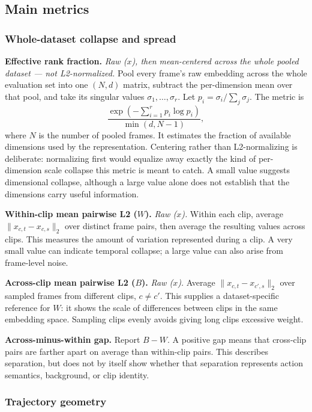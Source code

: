 \subsection{Main metrics}

\subsubsection{Whole-dataset collapse and spread}

\noindent\textbf{Effective rank fraction.} \emph{Raw ($x$), then mean-centered across the
whole pooled dataset --- not L2-normalized.} Pool every frame's raw embedding across the
whole evaluation set into one $(N,d)$ matrix, subtract the per-dimension mean over that
pool, and take its singular values $\sigma_1,\ldots,\sigma_r$. Let
$p_i=\sigma_i/\sum_j\sigma_j$. The metric is
\[
    \frac{\exp\!\left(-\sum_{i=1}^{r}p_i\log p_i\right)}
         {\min(d,N-1)},
\]
where $N$ is the number of pooled frames. It estimates the fraction of available
dimensions used by the representation. Centering rather than L2-normalizing is
deliberate: normalizing first would equalize away exactly the kind of per-dimension
scale collapse this metric is meant to catch. A small value suggests dimensional
collapse, although a large value alone does not establish that the dimensions carry
useful information.

\noindent\textbf{Within-clip mean pairwise L2 ($W$).} \emph{Raw ($x$).} Within each
clip, average $\|x_{c,t}-x_{c,s}\|_2$ over distinct frame pairs, then average the
resulting values across clips. This measures the amount of variation represented during
a clip. A very small value can indicate temporal collapse; a large value can also arise
from frame-level noise.

\noindent\textbf{Across-clip mean pairwise L2 ($B$).} \emph{Raw ($x$).} Average
$\|x_{c,t}-x_{c',s}\|_2$ over sampled frames from different clips, $c\neq c'$. This
supplies a dataset-specific reference for $W$: it shows the scale of differences between
clips in the same embedding space. Sampling clips evenly avoids giving long clips
excessive weight.

\noindent\textbf{Across-minus-within gap.}
Report $B-W$. A positive gap means that cross-clip pairs are farther
apart on average than within-clip pairs. This describes separation,
but does not by itself show whether that separation represents action
semantics, background, or clip identity.

\subsubsection{Trajectory geometry}

